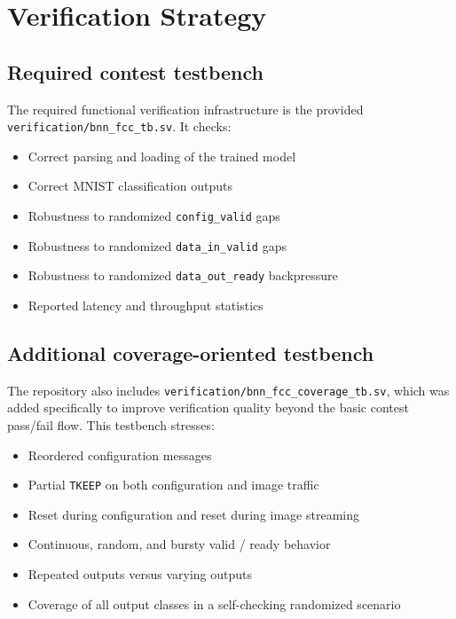 \documentclass[11pt]{article}
\begin{document}
\section{Verification Strategy}

\subsection{Required contest testbench}

The required functional verification infrastructure is the provided \texttt{verification/bnn\_fcc\_tb.sv}. It checks:

\begin{itemize}[leftmargin=1.5em]
\item Correct parsing and loading of the trained model
\item Correct MNIST classification outputs
\item Robustness to randomized \texttt{config\_valid} gaps
\item Robustness to randomized \texttt{data\_in\_valid} gaps
\item Robustness to randomized \texttt{data\_out\_ready} backpressure
\item Reported latency and throughput statistics
\end{itemize}

\subsection{Additional coverage-oriented testbench}

The repository also includes \texttt{verification/bnn\_fcc\_coverage\_tb.sv}, which was added specifically to improve verification quality beyond the basic contest pass/fail flow. This testbench stresses:

\begin{itemize}[leftmargin=1.5em]
\item Reordered configuration messages
\item Partial \texttt{TKEEP} on both configuration and image traffic
\item Reset during configuration and reset during image streaming
\item Continuous, random, and bursty valid / ready behavior
\item Repeated outputs versus varying outputs
\item Coverage of all output classes in a self-checking randomized scenario
\end{itemize}
\end{document}
